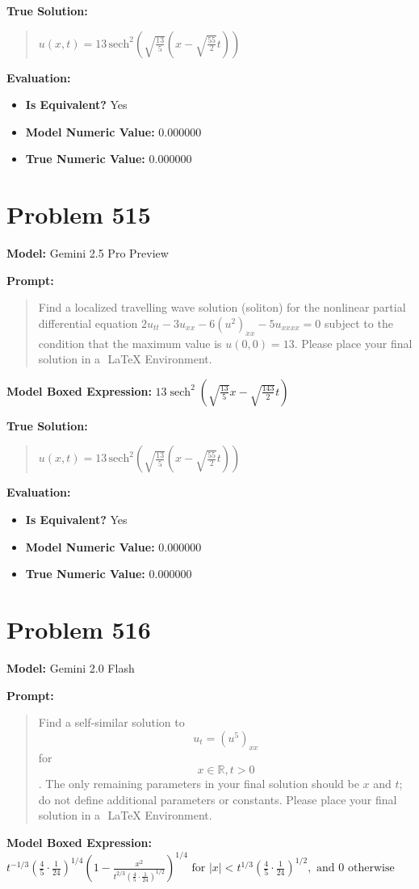 \documentclass{article}
\begin{document}
\textbf{True Solution:}
\begin{quote}
$u(x,t) = 13\,\mathrm{sech}^2\left(\sqrt{\frac{13}{5}}\left(x-\sqrt{\frac{55}{2}}t\right)\right)$
\end{quote}

\textbf{Evaluation:}
\begin{itemize}
\item \textbf{Is Equivalent?} Yes
\item \textbf{Model Numeric Value:} 0.000000
\item \textbf{True Numeric Value:} 0.000000
\end{itemize}
\vspace{1cm}
\section*{Problem 515}
\textbf{Model:} Gemini 2.5 Pro Preview

\textbf{Prompt:}
\begin{quote}
Find a localized travelling wave solution (soliton) for the nonlinear partial differential equation $2u_{tt} - 3u_{xx} - 6(u^2)_{xx} - 5u_{xxxx}=0$ subject to the condition that the maximum value is $u(0,0) = 13$. Please place your final solution in a $\boxed{}$ LaTeX Environment.
\end{quote}
\textbf{Model Boxed Expression:} $13 \operatorname{sech}^2\left(\sqrt{\frac{13}{5}}x - \sqrt{\frac{143}{2}}t\right)$

\textbf{True Solution:}
\begin{quote}
$u(x,t) = 13\,\mathrm{sech}^2\left(\sqrt{\frac{13}{5}}\left(x-\sqrt{\frac{55}{2}}t\right)\right)$
\end{quote}

\textbf{Evaluation:}
\begin{itemize}
\item \textbf{Is Equivalent?} Yes
\item \textbf{Model Numeric Value:} 0.000000
\item \textbf{True Numeric Value:} 0.000000
\end{itemize}
\vspace{1cm}
\section*{Problem 516}
\textbf{Model:} Gemini 2.0 Flash

\textbf{Prompt:}
\begin{quote}
Find a self-similar solution to $$u_t=(u^5)_{xx}$$ for $$x\in \mathbb{R}, t>0$$. The only remaining parameters in your final solution should be $x$ and $t$; do not define additional parameters or constants. Please place your final solution in a $\boxed{}$ LaTeX Environment.
\end{quote}
\textbf{Model Boxed Expression:} $t^{-1/3} \left( \frac{4}{5} \cdot \frac{1}{24} \right)^{1/4} \left( 1 - \frac{x^2}{t^{2/3} (\frac{4}{5} \cdot \frac{1}{24})^{1/2}} \right)^{1/4} \text{ for } |x| < t^{1/3} (\frac{4}{5} \cdot \frac{1}{24})^{1/2}, \text{ and } 0 \text{ otherwise}$
\end{document}

